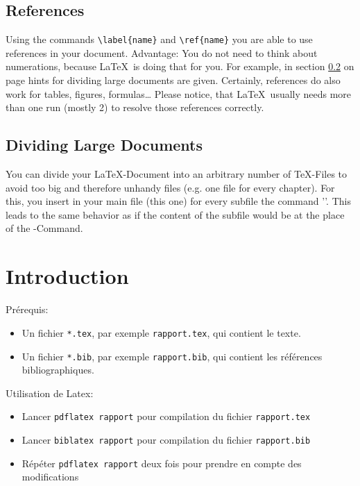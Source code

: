 \documentclass{article}
\begin{document}
{\subsection{References}
\label{references}
Using the commands \verb#\label{name}# and \verb#\ref{name}# you are able
to use references in your document. Advantage: You do not need to think
about numerations, because \LaTeX\ is doing that for you.
For example, in section \ref{dividing} on page \pageref{dividing} hints for
dividing large documents are given.
Certainly, references do also work for tables, figures, formulas\ldots
Please notice, that \LaTeX\ usually needs more than one run (mostly 2) to
resolve those references correctly.
\subsection{Dividing Large Documents}
\label{dividing}
You can divide your \LaTeX-Document into an arbitrary number of \TeX-Files
to avoid too big and therefore unhandy files (e.g. one file for every chapter).
For this, you insert in your main file (this one) for every subfile
the command '\verb##'. This leads to the same behavior
as if the content of the subfile would be at the place of the
\verb##-Command.


\appendix
\section{Introduction}\label{sec:intro}

Prérequis:
\begin{itemize}
\item Un fichier \texttt{*.tex}, par exemple \texttt{rapport.tex}, qui
  contient le texte.
\item Un fichier \texttt{*.bib}, par exemple \texttt{rapport.bib}, qui
  contient les références bibliographiques.
\end{itemize}

Utilisation de Latex:
\begin{itemize}
\item Lancer \texttt{pdflatex rapport} pour compilation du fichier
  \texttt{rapport.tex}
\item Lancer \texttt{biblatex rapport} pour compilation du fichier
  \texttt{rapport.bib}
\item Répéter \texttt{pdflatex rapport} deux fois pour prendre en
  compte des modifications
\end{itemize}

}
\end{document}
